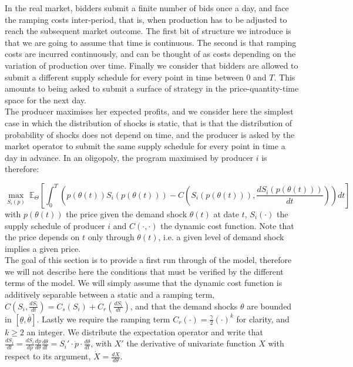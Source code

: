 In the real market, bidders submit a finite number of bids once a day, and face the ramping costs inter-period, that is, when production has to be adjusted to reach the subsequent market outcome. The first bit of structure we introduce is that we are going to assume that time is continuous. The second is that ramping costs are incurred continuously, and can be thought of as costs depending on the variation of production over time. Finally we consider that bidders are allowed to submit a different supply schedule for every point in time between $0$ and $T$. This amounts to being asked to submit a surface of strategy in the price-quantity-time space for the next day. \\

The producer maximises her expected profits, and we consider here the simplest case in which the distribution of shocks is static, that is that the distribution of probability of shocks does not depend on time, and the producer is asked by the market operator to submit the same supply schedule for every point in time a day in advance. In an oligopoly, the program maximised by producer $i$ is therefore:

\begin{equation}
\displaystyle{\max_{S_i(p)}}~\mathbb{E}_{\Theta}\left[\int_{0}^{T} \left(p(\theta(t))S_i(p(\theta(t))) -C\left(S_i(p(\theta(t))),\frac{dS_i(p(\theta(t)))}{dt} \right)\right)dt\right]
\end{equation}
with $p(\theta(t))$ the price given the demand shock $\theta(t)$ at date $t$, $S_i(\cdot)$ the supply schedule of producer $i$ and $C(\cdot,\cdot)$ the dynamic cost function. Note that the price depends on $t$ only through $\theta(t)$, i.e. a given level of demand shock implies a given price.  \\

The goal of this section is to provide a first run through of the model, therefore we will not describe here the conditions that must be verified by the different terms of the model. We will simply assume that the dynamic cost function is additively separable between a static and a ramping term, $C(S_i,\frac{dS_i}{dt})=C_s(S_i)+C_r(\frac{dS_i}{dt})$, and that the demand shocks $\theta$ are bounded in $[\underline{\theta},\overline{\theta}]$. Lastly we require the ramping term $C_r(\cdot)=\frac{\gamma}{2}(\cdot)^k$ for clarity, and $k\geq2$ an integer. We distribute the expectation operator and write that $\frac{dS_i}{dt}=\frac{dS_i}{dp}\frac{dp}{d\theta}\frac{d\theta}{dt}=S_i'\cdot \dot{p}\cdot \frac{d\theta}{dt}$, with $X'$ the derivative of univariate function $X$ with respect to its argument, $\dot{X}=\frac{dX}{d\theta}$. \\

